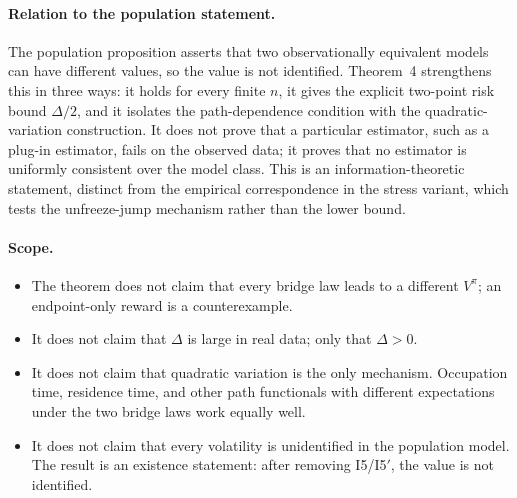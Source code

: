 \paragraph{Relation to the population statement.}
The population proposition asserts that two observationally equivalent
models can have different values, so the value is not identified.
Theorem~4 strengthens this in three ways: it holds for every finite $n$,
it gives the explicit two-point risk bound $\Delta/2$, and it isolates
the path-dependence condition with the quadratic-variation construction.
It does not prove that a particular estimator, such as a plug-in
estimator, fails on the observed data; it proves that no estimator is
uniformly consistent over the model class.  This is an
information-theoretic statement, distinct from the empirical
correspondence in the stress variant, which tests the unfreeze-jump
mechanism rather than the lower bound.

\paragraph{Scope.}
\begin{itemize}
\item The theorem does not claim that every bridge law leads to a
different $V^\pi$; an endpoint-only reward is a counterexample.
\item It does not claim that $\Delta$ is large in real data; only that
$\Delta>0$.
\item It does not claim that quadratic variation is the only mechanism.
Occupation time, residence time, and other path functionals with
different expectations under the two bridge laws work equally well.
\item It does not claim that every volatility is unidentified in the
population model.  The result is an existence statement: after removing
I5/I5$'$, the value is not identified.
\end{itemize}

\let\theHequation\aVItheHequation
